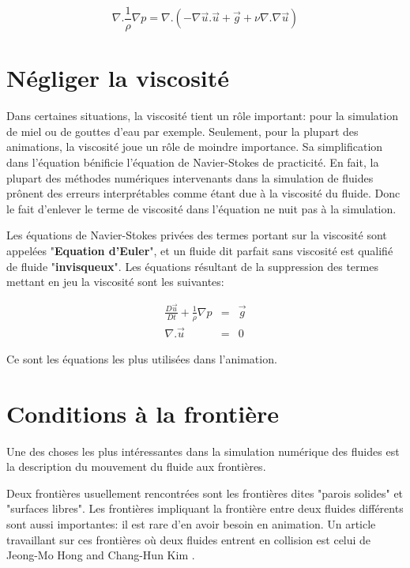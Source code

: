 \documentclass[11pt]{report}
\begin{document}
\begin{equation}
\nabla . \frac{1}{\rho}\nabla p = \nabla . (-\nabla \overrightarrow{u} . \overrightarrow{u}+ \overrightarrow{g} + \nu \nabla . \nabla \overrightarrow{u}) 
\end{equation}


\section{Négliger la viscosité}	

Dans certaines situations, la viscosité tient un rôle important: pour la simulation de miel ou de gouttes d'eau par exemple. Seulement, pour la plupart des animations, la viscosité joue un rôle de moindre importance. Sa simplification dans l'équation bénificie l'équation de Navier-Stokes de practicité. En fait, la plupart des méthodes numériques intervenants dans la simulation de fluides prônent des erreurs interprétables comme étant due à la viscosité du fluide. Donc le fait d'enlever le terme de viscosité dans l'équation ne nuit pas à la simulation. 

Les équations de Navier-Stokes privées des termes portant sur la viscosité sont appelées "\textbf{Equation d'Euler}", et un fluide dit parfait sans viscosité est qualifié de fluide "\textbf{invisqueux}". Les équations résultant de la suppression des termes mettant en jeu la viscosité sont les suivantes:

\begin{eqnarray}
\frac{D\overrightarrow{u}}{Dt} + \frac{1}{\rho} \nabla p & = & \overrightarrow{g} \\
\nabla . \overrightarrow{u} & = & 0
\end{eqnarray}

Ce sont les équations les plus utilisées dans l'animation.

\section{Conditions à la frontière}	

Une des choses les plus intéressantes dans la simulation numérique des fluides est la description du mouvement du fluide aux frontières. 

Deux frontières usuellement rencontrées sont les frontières dites "parois solides" et "surfaces libres". Les frontières impliquant la frontière entre deux fluides différents sont aussi importantes: il est rare d'en avoir besoin en animation. Un article travaillant sur ces frontières où deux fluides entrent en collision est celui de Jeong-Mo Hong and Chang-Hun Kim \cite{Hong-05}.
\end{document}
